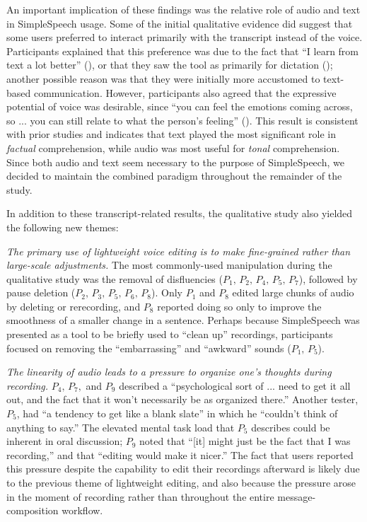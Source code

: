 An important implication of these findings was the relative role of audio and text in SimpleSpeech usage.
Some of the initial qualitative evidence did suggest that some users preferred to interact primarily with the transcript instead of the voice.
Participants explained that this preference was due to the fact that ``I learn from text a lot better'' (), or that they saw the tool as primarily for dictation (); another possible reason was that they were initially more accustomed to text-based communication.
However, participants also agreed that the expressive potential of voice was desirable, since ``you can feel the emotions coming across, so ... you can still relate to what the person’s feeling'' ().
This result is consistent with prior studies \cite{ice,oomen,tu} and indicates that text played the most significant role in \emph{factual} comprehension, while audio was most useful for \emph{tonal} comprehension.
Since both audio and text seem necessary to the purpose of SimpleSpeech, we decided to maintain the combined paradigm throughout the remainder of the study.

In addition to these transcript-related results, the qualitative study also yielded the following new themes:

\emph{The primary use of lightweight voice editing is to make fine-grained rather than large-scale adjustments.}
The most commonly-used manipulation during the qualitative study was the removal of disfluencies ($P_1,\,P_2,\,P_4,\,P_5,\,P_7$), followed by pause deletion ($P_2,\,P_3,\,P_5,\,P_6,\,P_8$). 
Only $P_1$ and $P_8$ edited large chunks of audio by deleting or rerecording, and $P_8$ reported doing so only to improve the smoothness of a smaller change in a sentence.
Perhaps because SimpleSpeech was presented as a tool to be briefly used to ``clean up'' recordings, participants focused on removing the ``embarrassing'' and ``awkward'' sounds ($P_1,\,P_5$). 

\emph{The linearity of audio leads to a pressure to organize one's thoughts during recording.}
$P_4,\,P_7,$ and $P_9$ described a ``psychological sort of ... need to get it all out, and the fact that it won't necessarily be as organized there.'' 
Another tester, $P_5$, had ``a tendency to get like a blank slate'' in which he ``couldn't think of anything to say.'' 
The elevated mental task load that $P_5$ describes could be inherent in oral discussion; $P_9$ noted that ``[it] might just be the fact that I was recording,'' and that ``editing would make it nicer.'' 
The fact that users reported this pressure despite the capability to edit their recordings afterward is likely due to the previous theme of lightweight editing, and also because the pressure arose in the moment of recording rather than throughout the entire message-composition workflow.

